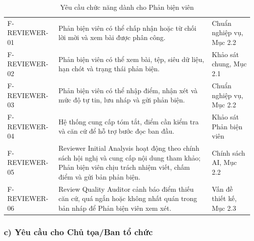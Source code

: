 \begin{table}[H]
\centering
\caption{Yêu cầu chức năng dành cho Phản biện viên}
\setlength{\tabcolsep}{2pt}
\renewcommand{\arraystretch}{1.15}
\begin{tabular}{|C{0.22\textwidth}|P{0.52\textwidth}|P{0.19\textwidth}|}
\hline
{} &  &  \\ \hline
F-REVIEWER-01 & Phản biện viên có thể chấp nhận hoặc từ chối lời mời và xem bài được phân công. & Chuẩn nghiệp vụ, Mục 2.2 \\ \hline
F-REVIEWER-02 & Phản biện viên có thể xem bài, tệp, siêu dữ liệu, hạn chót và trạng thái phản biện. & Khảo sát chung, Mục 2.1 \\ \hline
F-REVIEWER-03 & Phản biện viên có thể nhập điểm, nhận xét và mức độ tự tin, lưu nháp và gửi phản biện. & Chuẩn nghiệp vụ, Mục 2.2 \\ \hline
F-REVIEWER-04 & Hệ thống cung cấp tóm tắt, điểm cần kiểm tra và căn cứ để hỗ trợ bước đọc ban đầu. & Khảo sát Phản biện viên \\ \hline
F-REVIEWER-05 & Reviewer Initial Analysis hoạt động theo chính sách hội nghị và cung cấp nội dung tham khảo; Phản biện viên chịu trách nhiệm viết, chấm điểm và gửi bản phản biện. & Chính sách AI, Mục 2.2 \\ \hline
F-REVIEWER-06 & Review Quality Auditor cảnh báo điểm thiếu căn cứ, quá ngắn hoặc không nhất quán trong bản nháp để Phản biện viên xem xét. & Vấn đề thiết kế, Mục 2.3 \\ \hline
\end{tabular}
\end{table}

\subsubsection{c) Yêu cầu cho Chủ tọa/Ban tổ chức}

